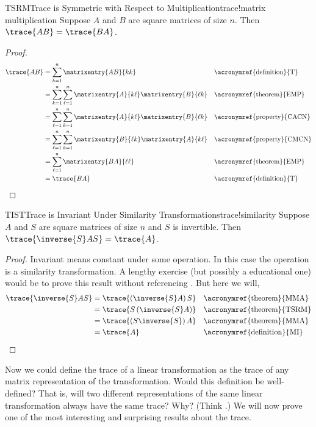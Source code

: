 %
\begin{theorem}{TSRM}{Trace is Symmetric with Respect to Multiplication}{trace!matrix multiplication}
Suppose $A$ and $B$ are square matrices of size $n$.  Then $\trace{AB}=\trace{BA}$.
\end{theorem}
%
\begin{proof}
%
\begin{align*}
\trace{AB}
&=\sum_{k=1}^n \matrixentry{AB}{kk}&&\text{\acronymref{definition}{T}}\\
&=\sum_{k=1}^n \sum_{\ell=1}^n \matrixentry{A}{k\ell}\matrixentry{B}{\ell k}&&\text{\acronymref{theorem}{EMP}}\\
&=\sum_{\ell=1}^n \sum_{k=1}^n \matrixentry{A}{k\ell}\matrixentry{B}{\ell k}&&\text{\acronymref{property}{CACN}}\\
&=\sum_{\ell=1}^n \sum_{k=1}^n \matrixentry{B}{\ell k}\matrixentry{A}{k\ell}&&\text{\acronymref{property}{CMCN}}\\
&=\sum_{\ell=1}^{n} \matrixentry{BA}{\ell\ell}&&\text{\acronymref{theorem}{EMP}}\\
&=\trace{BA}&&\text{\acronymref{definition}{T}}
\end{align*}
%
\end{proof}
%
\begin{theorem}{TIST}{Trace is Invariant Under Similarity Transformations}{trace!similarity}
Suppose $A$ and $S$ are square matrices of size $n$ and $S$ is invertible.  Then $\trace{\inverse{S}AS}=\trace{A}$.
\end{theorem}
%
\begin{proof} Invariant means constant under some operation.  In this case the operation is a similarity transformation.  A lengthy exercise (but possibly a educational one) would be to prove this result without referencing .  But here we will,
%
\begin{align*}
\trace{\inverse{S}AS}
&=\trace{\left(\inverse{S}A\right)S}&&\text{\acronymref{theorem}{MMA}}\\
&=\trace{S\left(\inverse{S}A\right)}&&\text{\acronymref{theorem}{TSRM}}\\
&=\trace{\left(S\inverse{S}\right)A}&&\text{\acronymref{theorem}{MMA}}\\
&=\trace{A}&&\text{\acronymref{definition}{MI}}
\end{align*}
%
\end{proof}
%
Now we could define the trace of a linear transformation as the trace of any matrix representation of the transformation. Would this definition be well-defined?  That is, will two different representations of the same linear transformation always have the same trace? Why? (Think .) We will now prove one of the most interesting and surprising results about the trace.
